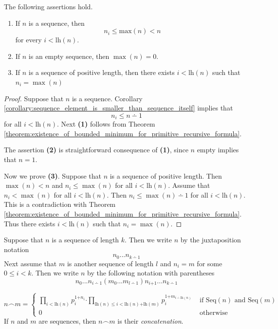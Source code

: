 \documentclass[10pt]{amsart}
\newcommand{\mle}{\boldsymbol{<}}
\newcommand{\mleq}{\boldsymbol{\leq}}
\newcommand{\meq}{\boldsymbol{=}}
\newcommand{\mplus}{\boldsymbol{+}}
\newcommand{\mdot}{\boldsymbol{\cdot}}
\begin{document}
\begin{fact}\label{fact:maximum_of_a_sequence}
	The following assertions hold.
	\begin{enumerate}[label=\emph{\textbf{(\arabic*)}}, leftmargin=3.0em]
		\item If $n$ is a sequence, then
		      $$n_i \mleq \mathrm{max}(n) \mle n$$
		      for every $i \mle \mathrm{lh}(n)$.
		\item If $n$ is an empty sequence, then $\max(n) \meq 0$.
		\item If $n$ is a sequence of positive length, then there exists $i \mle \mathrm{lh}(n)$ such that $n_i \meq \max(n)$
	\end{enumerate}
\end{fact}
\begin{proof}
	Suppose that $n$ is a sequence. Corollary \ref{corollary:sequence_element_is_smaller_than_sequence_itself} implies that
	$$n_i \mleq n \dotminus 1$$
	for all $i \mle \mathrm{lh}(n)$. Next \textbf{(1)} follows from Theorem \ref{theorem:existence_of_bounded_minimum_for_primitive_recursive_formula}.

	The assertion \textbf{(2)} is straightforward consequence of \textbf{(1)}, since $n$ empty implies that $n \meq 1$.

	Now we prove \textbf{(3)}. Suppose that $n$ is a sequence of positive length. Then $\max(n) \mle n$ and $n_i \mleq \max(n)$ for all $i \mle \mathrm{lh}(n)$. Assume that $n_i \mle \max(n)$ for all $i \mle \mathrm{lh}(n)$. Then $n_i \mleq \max(n) \dotminus 1$ for all $i \mle \mathrm{lh}(n)$. This is a contradiction with Theorem \ref{theorem:existence_of_bounded_minimum_for_primitive_recursive_formula}. Thus there exists $i \mle \mathrm{lh}(n)$ such that $n_i \meq \max(n)$.
\end{proof}

\begin{remark}\label{remark:notation_for_sequences}
	Suppose that $n$ is a sequence of length $k$. Then we write $n$ by the juxtaposition notation
	$$n_0...n_{k\dotminus 1}$$
	Next assume that $m$ is another sequence of length $l$ and $n_i \meq m $ for some $0 \mleq i \mle k$. Then we write $n$ by the following notation with parentheses
	$$n_0...n_{i\dotminus 1}\left(m_0...m_{l\dotminus 1}\right)n_{i \mplus 1}...n_{k\dotminus 1}$$
\end{remark}

\begin{definition}
	$$n \frown m \meq \begin{cases}
    \prod_{i \mle \mathrm{lh}(n)}p_i^{1 \mplus n_i}\mdot \prod_{\mathrm{lh}(n) \mleq i \mle \mathrm{lh}(n) \mplus \mathrm{lh}(m)}p_i^{1 \mplus m_{i\dotminus \mathrm{lh}(n)}} & \mbox{ if }\mathrm{Seq}(n)\mbox{ and }\mathrm{Seq}(m) \\[0.3em]
			0                                                                                                                                               & \mbox{ otherwise }
		\end{cases}
	$$
	If $n$ and $m$ are sequences, then $n \frown m$ is their \textit{concatenation}.
\end{definition}
\end{document}
